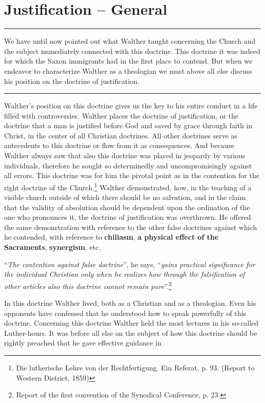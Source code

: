 \chapter{Justification -- General}

\hrule
\vspace{.30cm}
We have until now pointed out what Walther taught concerning the Church and the subject immediately connected with this doctrine.  This doctrine it was indeed for which the Saxon immigrants had in the first place to contend.  But when we endeavor to characterize Walther as a theologian we must above all else discuss his position on the doctrine of justification.
\vspace{.30cm}
\hrule
\vspace{1.25cm}
                Walther’s position on this doctrine gives us the key to his entire conduct in a life filled with controversies.  Walther places the doctrine of justification, or the doctrine that a man is justified before God and saved by grace through faith in Christ, in the center of all Christian doctrines.  All other doctrines serve as antecedents to this doctrine or flow from it as consequences.  And because Walther always saw that also this doctrine was placed in jeopardy by various individuals, therefore he sought so determinedly and uncompromisingly against all errors.  This doctrine was for him the pivotal point as in the contention for the right doctrine of the Church.\footnote{Die lutherische Lehre von der Rechtfertigung.  Ein Referat, p. 93. (Report to Western District, 1859)} Walther demonstrated, how, in the teaching of a visible church outside of which there should be no salvation, and in the claim that the validity of absolution should be dependent upon the ordination of the one who pronounces it, the doctrine of justification was overthrown.  He offered the same demonstration with reference to the other false doctrines against which he contended, with reference to \textbf{chiliasm}, \textbf{a physical effect of the Sacraments}, \textbf{synergism}, etc.  \par “\textit{The contention against false doctrine}”, he says, “\textit{gains practical significance for the individual Christian only when he realizes how through the falsification of other articles also this doctrine cannot remain pure}”.\footnote{Report of the first convention of the Synodical Conference, p. 23.} \par In this doctrine Walther lived, both as a Christian and as a theologian.  Even his opponents have confessed that he understood how to speak powerfully of this doctrine.  Concerning this doctrine Walther held the most lectures in his so-called Luther-hours.  It was before all else on the subject of how this doctrine should be rightly preached that he gave effective guidance in 